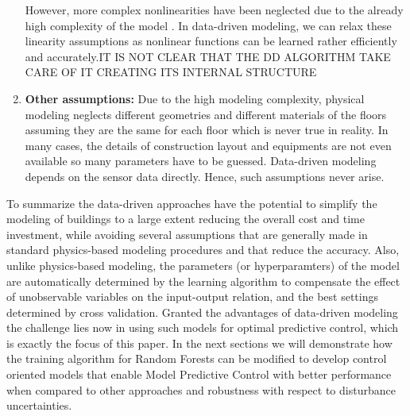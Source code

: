 \begin{enumerate}
{	However, more complex nonlinearities have been neglected due to the already high complexity of the model \cite{Sturzenegger2016}. 
	In data-driven modeling, we can relax these linearity assumptions as nonlinear functions can be learned rather efficiently and accurately.\textcolor[rgb]{1,0,0}{IT IS NOT CLEAR THAT THE DD ALGORITHM TAKE CARE OF IT CREATING ITS INTERNAL STRUCTURE}}
	\item \textcolor[rgb]{0,0,1}{\textbf{Other assumptions:} 
	Due to the high modeling complexity, physical modeling neglects different geometries and different materials of the floors assuming they are the same for each floor which is never true in reality.
	In many cases, the details of construction layout and equipments are not even available so many parameters have to be guessed.
	Data-driven modeling depends on the sensor data directly. 
	Hence, such assumptions never arise.}
\end{enumerate}

\textcolor[rgb]{0,0,1}{To summarize the data-driven approaches have the potential to simplify the modeling of buildings to a large extent reducing the overall cost and time investment, while avoiding several assumptions that are generally made in standard physics-based modeling procedures and that reduce the accuracy. Also, unlike physics-based modeling, the parameters (or hyperparamters) of the model are automatically determined by the learning algorithm to compensate the effect of unobservable variables on the input-output relation, and the best settings determined by cross validation. Granted the advantages of data-driven modeling the challenge lies now in using such models for optimal predictive control, which is exactly the focus of this paper. In the next sections we will demonstrate how the training algorithm for Random Forests can be modified to develop control oriented models that enable Model Predictive Control with better performance when compared to other approaches and robustness with respect to disturbance uncertainties.}